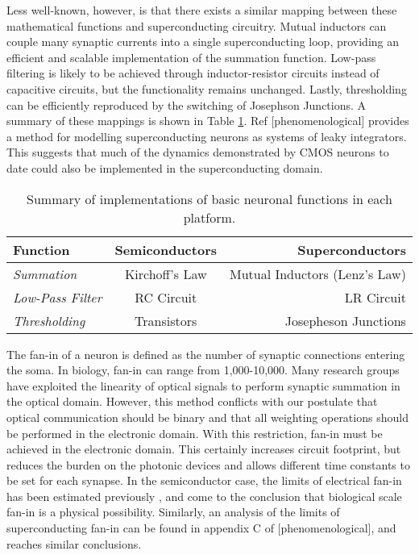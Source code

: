 \documentclass[twocolumn]{article}
\begin{document}
Less well-known, however, is that there exists a similar mapping between these mathematical functions and superconducting circuitry. Mutual inductors can couple many synaptic currents into a single superconducting loop, providing an efficient and scalable implementation of the summation function. Low-pass filtering is likely to be achieved through inductor-resistor circuits instead of capacitive circuits, but the functionality remains unchanged. Lastly, thresholding can be efficiently reproduced by the switching of Josephson Junctions.  A summary of these mappings is shown in Table \ref{tab:mathtable}. Ref [phenomenological] provides a method for modelling superconducting neurons as systems of leaky integrators. This suggests that much of the dynamics demonstrated by CMOS neurons to date could also be implemented in the superconducting domain.

\begin{table}[h!]
  \begin{center}
    \label{tab:mathtable}
    \begin{tabular}{l|c|r} %
      \textbf{Function} & \textbf{Semiconductors} & \textbf{Superconductors}\\
      \hline
      \textit{Summation} & Kirchoff's Law & Mutual Inductors (Lenz's Law)\\
      \textit{Low-Pass Filter} & RC Circuit & LR Circuit\\
      \textit{Thresholding} & Transistors & Josepheson Junctions\\
    \end{tabular}
    \caption{Summary of implementations of basic neuronal functions in each platform.}
  \end{center}
\end{table}

The fan-in of a neuron is defined as the number of synaptic connections entering the soma. In biology, fan-in can range from 1,000-10,000. Many research groups have exploited the linearity of optical signals to perform synaptic summation in the optical domain. However, this method conflicts with our postulate that optical communication should be binary and that all weighting operations should be performed in the electronic domain. With this restriction, fan-in must be achieved in the electronic domain. This certainly increases circuit footprint, but reduces the burden on the photonic devices and allows different time constants to be set for each synapse. In the semiconductor case, the limits of electrical fan-in has been estimated previously \cite{akima2014majority, dowrick2018fan}, and come to the conclusion that biological scale fan-in is a physical possibility. Similarly, an analysis of the limits of superconducting fan-in can be found in appendix C of [phenomenological], and reaches similar conclusions.
\end{document}
